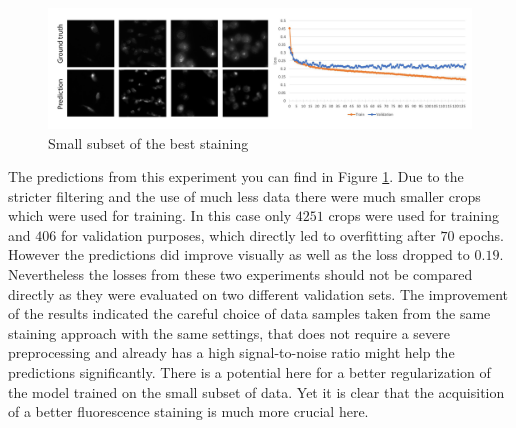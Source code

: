 \begin{figure}[htb]
	\begin{center}
		\includegraphics[width=\linewidth]{bilder/golgi/12-13/12-13.png}
		\caption{Small subset of the best staining}\label{fig:12-13}
	\end{center}
\end{figure}

The predictions from this experiment you can find in Figure \ref{fig:12-13}. Due to the stricter filtering and the use of much less data there were much smaller crops which were used for training. In this case only $4251$ crops were used for training and $406$ for validation purposes, which directly led to overfitting after $70$ epochs. However the predictions did improve visually as well as the loss dropped to $0.19$. Nevertheless the losses from these two experiments should not be compared directly as they were evaluated on two different validation sets. The improvement of the results indicated the careful choice of data samples taken from the same staining approach with the same settings, that does not require a severe preprocessing and already has a high signal-to-noise ratio might help the predictions significantly. There is a potential here for a better regularization of the model trained on the small subset of data. Yet it is clear that the acquisition of a better fluorescence staining is much more crucial here.